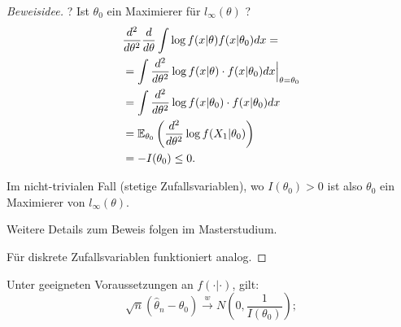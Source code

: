\documentclass{tstextbook}
\begin{document}
\begin{proof}[Beweisidee]
		? Ist $\theta_0$ ein Maximierer für  $ l_\infty (\theta)$ ?
		\[
		\begin{aligned}
			& \frac{d^2}{d\theta^2} \frac{d}{d\theta}\int\log f(x|\theta) f(x|\theta_0) dx = \\
			& = \int \frac{d^2}{d\theta^2}  \log f(x|\theta)\cdot f(x|\theta_0) dx  \Big|_{\theta=\theta_0} \\
			& = \int\frac{d^2}{d\theta^2}  \log f(x|\theta_0)\cdot f(x|\theta_0) dx \\
			& = \mathbb E_{\theta_0}\left(\frac{d^2}{d\theta^2}\log f(X_1|\theta_0)\right) \\
			& = - I(\theta_0) \le 0.
		\end{aligned}
		\]
		
		Im nicht-trivialen Fall (stetige Zufallsvariablen), wo $ I(\theta_0)>0 $ ist also $ \theta_0 $ ein Maximierer von $ l_\infty(\theta) $. 
		
		Weitere Details zum Beweis folgen im Masterstudium.
		
		Für diskrete Zufallsvariablen funktioniert analog.
	\end{proof}
	
	\begin{satz}
		Unter geeigneten Voraussetzungen an $ f(\cdot|\cdot) $, gilt:
		\[
		\sqrt{n}\left(\hat{\theta}_n-\theta_0\right) \xrightarrow{w} N\left(0,\frac{1}{I(\theta_0)}\right);
		\]
		
	\end{satz}
\end{document}

